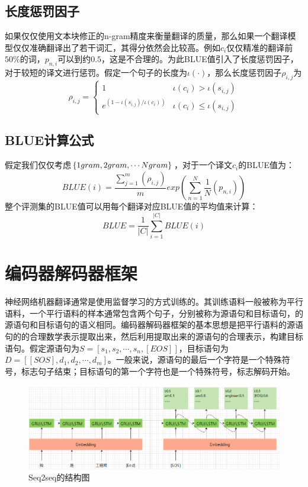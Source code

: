 \documentclass[twoside,a4paper,12pt]{book}%
\begin{document}
\subsection{长度惩罚因子}
如果仅仅使用文本块修正的n-gram精度来衡量翻译的质量，那么如果一个翻译模型仅仅准确翻译出了若干词汇，其得分依然会比较高。例如$c_i$仅仅精准的翻译前$50\%$的词，$p_{n,i}$可以到约$0.5$，这是不合理的。为此BLUE值引入了长度惩罚因子，对于较短的译文进行惩罚。假定一个句子的长度为$\iota(\cdot)$，那么长度惩罚因子$\rho_{i,j}$为
$$\rho_{i,j}=
	\left\{
		\begin{array}{lr}
			1&\iota(c_i)>\iota(s_{i,j})\\
			e^{(1-\iota(s_{i,j})/\iota(c_i))}&\iota(c_i) \le \iota(s_{i,j})
		\end{array}
	\right.
$$
\subsection{BLUE计算公式}
假定我们仅仅考虑$\{1\-gram,2\-gram,\cdots N\-gram\}$，对于一个译文$c_i$的BLUE值为：
$$
BLUE(i)=\frac{\sum_{j=1}^{m}{(\rho_{i,j})}
			 }{m}exp\left (\sum_{n=1}^{N}{\frac{1}{N}(p_{n,i})}\right )
$$
整个评测集的BLUE值可以用每个翻译对应BLUE值的平均值来计算：
$$
BLUE=\frac{1}{|C|}\sum_{i=1}^{|C|}{BLUE(i)}
$$


\section{编码器解码器框架}
神经网络机器翻译通常是使用监督学习的方式训练的。其训练语料一般被称为平行语料，一个平行语料的样本通常包含两个句子，分别被称为源语句和目标语句，的源语句和目标语句的语义相同。编码器解码器框架的基本思想是把平行语料的源语句的的合理数学表示提取出来，然后利用提取出来的源语句的合理表示，构建目标语句。假定源语句为$S=[s_1,s_2,\cdots,s_n,[EOS]]$，目标语句为$D=[[SOS],d_1,d_2,\cdots,d_m]$。一般来说，源语句的最后一个字符是一个特殊符号，标志句子结束；目标语句的第一个字符也是一个特殊符号，标志解码开始。

\begin{figure}[htbp]
\begin{center}
\includegraphics[width=5.6in]{figures/seq2seq1.png}
\caption{Seq2seq的结构图}
\label{fig:seq2seq1}
\end{center}
\end{figure}
\end{document}
